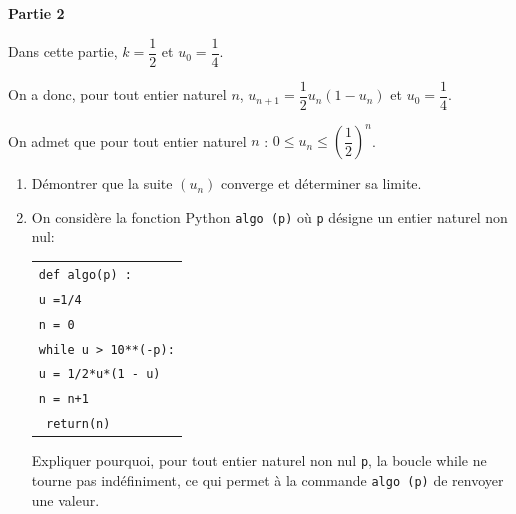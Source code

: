 \bigskip

\textbf{Partie 2}

\medskip

 Dans cette partie, $k= \dfrac12$  et $u_0 = \dfrac14$.

On a donc, pour tout entier naturel $n$,\: $u_{n+1} = \dfrac12 u_n \left(1 - u_n\right)$ et $u_0 = \dfrac14$.

On admet que pour tout entier naturel $n$ :\: $0 \leqslant u_n \leqslant \left(\dfrac12\right)^n$.

\medskip

\begin{enumerate}
\item Démontrer que la suite $\left(u_n\right)$ converge et déterminer sa limite.
\item On considère la fonction Python \texttt{algo (p)} où \texttt{p} désigne un entier naturel non nul:

\begin{center}
\begin{tabular}{|l|}\hline
\texttt{def algo(p) :}\\
\quad  \texttt{u =1/4}\\
\quad \texttt{n = 0}\\
\quad \texttt{while u > 10**(-p):}\\
\quad \quad \texttt{u = 1/2*u*(1 - u)}\\
\quad \quad \texttt{n = n+1}\\
\quad \texttt{ return(n)}\\ \hline
\end{tabular}
\end{center}
Expliquer pourquoi, pour tout entier naturel non nul \texttt{p}, la boucle while ne tourne pas indéfiniment, ce qui permet à la commande \texttt{algo (p)} de renvoyer une valeur.
\end{enumerate}

\bigskip
